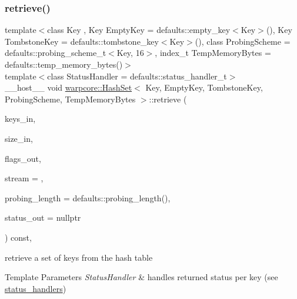 \subsubsection{\texorpdfstring{retrieve()}{retrieve()}\hspace{0.1cm}{\footnotesize\ttfamily [2/2]}}
{\footnotesize\ttfamily template$<$class Key , Key Empty\+Key = defaults\+::empty\+\_\+key$<$\+Key$>$(), Key Tombstone\+Key = defaults\+::tombstone\+\_\+key$<$\+Key$>$(), class Probing\+Scheme  = defaults\+::probing\+\_\+scheme\+\_\+t$<$\+Key, 16$>$, index\+\_\+t Temp\+Memory\+Bytes = defaults\+::temp\+\_\+memory\+\_\+bytes()$>$ \\
template$<$class Status\+Handler  = defaults\+::status\+\_\+handler\+\_\+t$>$ \\
\+\_\+\+\_\+host\+\_\+\+\_\+ void \hyperlink{classwarpcore_1_1HashSet}{warpcore\+::\+Hash\+Set}$<$ Key, Empty\+Key, Tombstone\+Key, Probing\+Scheme, Temp\+Memory\+Bytes $>$\+::retrieve (\begin{DoxyParamCaption}\item[{key\+\_\+type $\ast$}]{keys\+\_\+in,  }\item[{index\+\_\+type}]{size\+\_\+in,  }\item[{bool $\ast$}]{flags\+\_\+out,  }\item[{cuda\+Stream\+\_\+t}]{stream = {},  }\item[{index\+\_\+type}]{probing\+\_\+length = {\ttfamily defaults\+:\+:probing\+\_\+length()},  }\item[{typename Status\+Handler\+::base\+\_\+type $\ast$}]{status\+\_\+out = {\ttfamily nullptr} }\end{DoxyParamCaption}) const\hspace{0.3cm}{\ttfamily [inline]}, {\ttfamily [noexcept]}}



retrieve a set of keys from the hash table 


\begin{DoxyTemplParams}{Template Parameters}
{\em Status\+Handler} & handles returned status per key (see {\ttfamily \hyperlink{namespacewarpcore_1_1status__handlers}{status\+\_\+handlers}}) \\
\hline
\end{DoxyTemplParams}

